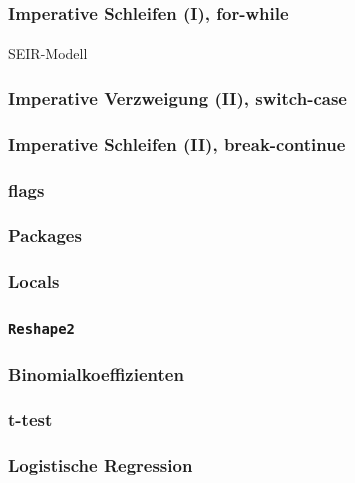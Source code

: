 \documentclass[paper=A4, pagesize, DIV=calc, smallheadings,
fontsize=12pt, expansion=false]{scrreprt}
\begin{document}
\subsubsection*{Imperative Schleifen (I), for-while}

\paragraph{}
SEIR-Modell

\subsubsection*{Imperative Verzweigung (II), switch-case}

\subsubsection*{Imperative Schleifen (II), break-continue}

\subsubsection*{flags}

\subsubsection*{Packages}

\subsubsection*{Locals}

\subsubsection*{\texttt{Reshape2}}

\subsubsection*{Binomialkoeffizienten}

\subsubsection*{t-test}

\subsubsection{Logistische Regression}
\end{document}
